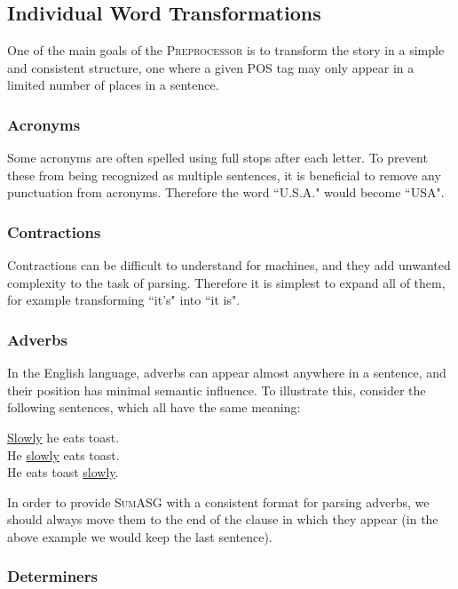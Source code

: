 \subsection{Individual Word Transformations}

One of the main goals of the \textsc{Preprocessor} is to transform the story in a simple and consistent structure, one where a given POS tag may only appear in a limited number of places in a sentence.

\subsubsection{Acronyms}

Some acronyms are often spelled using full stops after each letter. To prevent these from being recognized as multiple sentences, it is beneficial to remove any punctuation from acronyms. Therefore the word ``U.S.A." would become ``USA".

\subsubsection{Contractions}

Contractions can be difficult to understand for machines, and they add unwanted complexity to the task of parsing. Therefore it is simplest to expand all of them, for example transforming ``it's" into ``it is".

\subsubsection{Adverbs}

In the English language, adverbs can appear almost anywhere in a sentence, and their position has minimal semantic influence. To illustrate this, consider the following sentences, which all have the same meaning:

\begin{displayquote}
\underline{Slowly} he eats toast. \\
He \underline{slowly} eats toast. \\
He eats toast \underline{slowly}.
\end{displayquote}

In order to provide \textsc{SumASG} with a consistent format for parsing adverbs, we should always move them to the end of the clause in which they appear (in the above example we would keep the last sentence).


\subsubsection{Determiners}

